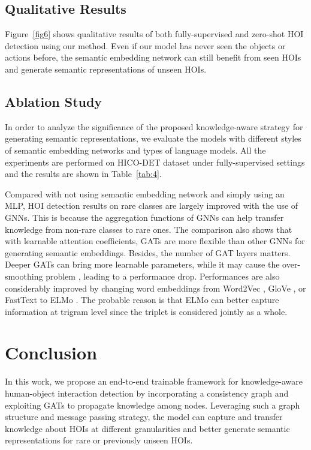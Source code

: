 \documentclass[sigconf,screen]{acmart}
\begin{document}
\subsection{Qualitative Results}

Figure~\ref{fig6} shows qualitative results of both fully-supervised and zero-shot HOI detection using our method. Even if our model has never seen the objects or actions before, the semantic embedding network can still benefit from seen HOIs and generate semantic representations of unseen HOIs.

\subsection{Ablation Study}

In order to analyze the significance of the proposed knowledge-aware strategy for generating semantic representations, we evaluate the models with different styles of semantic embedding networks and types of language models. All the experiments are performed on HICO-DET dataset under fully-supervised settings and the results are shown in Table~\ref{tab:4}.

Compared with not using semantic embedding network and simply using an MLP, HOI detection results on rare classes are largely improved with the use of GNNs. This is because the aggregation functions of GNNs can help transfer knowledge from non-rare classes to rare ones. The comparison also shows that with learnable attention coefficients, GATs are more flexible than other GNNs for generating semantic embeddings. Besides, the number of GAT layers matters. Deeper GATs can bring more learnable parameters, while it may cause the over-smoothing problem \cite{li2019deepgcns}, leading to a performance drop. Performances are also considerably improved by changing word embeddings from Word2Vec \cite{mikolov2013efficient}, GloVe \cite{pennington2014glove}, or FastText \cite{joulin2016bag} to ELMo \cite{peters2018deep}. The probable reason is that ELMo can better capture information at trigram level since the triplet is considered jointly as a whole.

\section{Conclusion}

In this work, we propose an end-to-end trainable framework for knowledge-aware human-object interaction detection by incorporating a consistency graph and exploiting GATs to propagate knowledge among nodes. Leveraging such a graph structure and message passing strategy, the model can capture and transfer knowledge about HOIs at different granularities and better generate semantic representations for rare or previously unseen HOIs.
\end{document}
